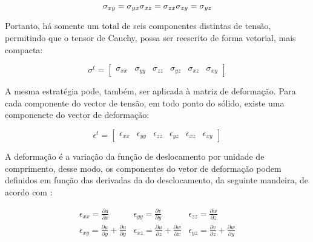 \begin{equation}
    \sigma_{xy} = \sigma_{yx} \\
    \sigma_{xz} = \sigma_{zx} \\
    \sigma_{zy} = \sigma_{yz} \\
\end{equation}

Portanto, há somente um total de seis componentes distintas de tensão, permitindo que o tensor de Cauchy, possa ser reescrito de forma vetorial, mais compacta:

\begin{equation} \label{eq:vetor_tensao}
    \sigma^t =  \begin{bmatrix}
        \sigma_{xx} & \sigma_{yy} & \sigma_{zz} & \sigma_{yz} & \sigma_{xz} & \sigma_{xy}
    \end{bmatrix}
\end{equation}

A mesma estratégia pode, também, ser aplicada à matriz de deformação. Para cada componente do vector de tensão, em todo ponto do sólido, existe uma componenete do vector de deformação:

\begin{equation} \label{eq:vector_deformacao}
    \epsilon^t =  \begin{bmatrix}
        \epsilon_{xx} & \epsilon_{yy} & \epsilon_{zz} & \epsilon_{yz} & \epsilon_{xz} & \epsilon_{xy}
     \end{bmatrix}
\end{equation}

A deformação é a variação da função de deslocamento por unidade de comprimento, desse modo, os componentes do vetor de deformação podem definidos em função das derivadas da do desclocamento, da seguinte mandeira, de acordo com :

\begin{equation} \label{eq:defomacoes}
    \begin{matrix}
        \epsilon_{xx} = \frac{\partial u}{\partial x} &
        \epsilon_{yy} = \frac{\partial v}{\partial y} &
        \epsilon_{zz} = \frac{\partial w}{\partial z} \\
        \epsilon_{xy} = \frac{\partial u}{\partial y} + \frac{\partial u}{\partial y} &
        \epsilon_{xz} = \frac{\partial u}{\partial z} + \frac{\partial w}{\partial x} &
        \epsilon_{yz} = \frac{\partial v}{\partial z} + \frac{\partial w}{\partial y}
    \end{matrix}
\end{equation}

